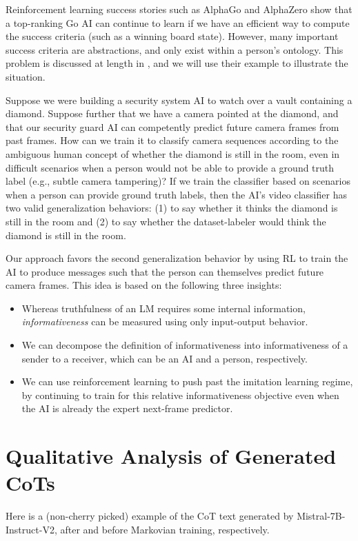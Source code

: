 \documentclass{article}
\theoremstyle{plain}
\theoremstyle{definition}
\theoremstyle{remark}
\begin{document}
Reinforcement learning success stories such as AlphaGo \citep{Silver2016} and AlphaZero \citep{Silver2017} show that a top-ranking Go AI can continue to learn if we have an efficient way to compute the success criteria (such as a winning board state). However, many important success criteria are abstractions, and only exist within a person's ontology. This problem is discussed at length in \citet{christiano2021eliciting}, and we will use their example to illustrate the situation. 

Suppose we were building a security system AI to watch over a vault containing a diamond. Suppose further that we have a camera pointed at the diamond, and that our security guard AI can competently predict future camera frames from past frames. How can we train it to classify camera sequences according to the ambiguous human concept of whether the diamond is still in the room, even in difficult scenarios when a person would not be able to provide a ground truth label (e.g., subtle camera tampering)? If we train the classifier based on scenarios when a person can provide ground truth labels, then the AI's video classifier has two valid generalization behaviors: (1) to say whether it thinks the diamond is still in the room and (2) to say whether the dataset-labeler would think the diamond is still in the room. 

Our approach favors the second generalization behavior by using RL to train the AI to produce messages such that the person can themselves predict future camera frames.
This idea is based on the following three insights:
\begin{itemize}
\item Whereas truthfulness of an LM requires some internal information, \emph{informativeness} can be measured using only input-output behavior.
\item We can decompose the definition of informativeness into informativeness of a sender to a receiver, which can be an AI and a person, respectively.
\item We can use reinforcement learning to push past the imitation learning regime, by continuing to train for this relative informativeness objective even when the AI is already the expert next-frame predictor.
\end{itemize}

\section{Qualitative Analysis of Generated CoTs}
Here is a (non-cherry picked) example of the CoT text generated by Mistral-7B-Instruct-V2, after and before Markovian training, respectively.  
\end{document}
